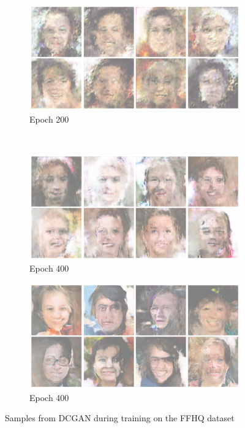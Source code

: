 \begin{figure}
    \begin{subfigure}[b]{0.45\textwidth}
        \includegraphics[width=\textwidth]{fig/dcgan/ffhq/epoch2000}
        \caption{Epoch 200}
    \end{subfigure}
    ~
    \begin{subfigure}[b]{0.45\textwidth}
        \includegraphics[width=\textwidth]{fig/dcgan/ffhq/epoch4000}
        \caption{Epoch 400}
    \end{subfigure}

    \begin{subfigure}[b]{\textwidth}
        \includegraphics[width=\textwidth]{fig/dcgan/ffhq/epoch10000}
        \caption{Epoch 400}
    \end{subfigure}
    \caption{Samples from DCGAN during training on the FFHQ dataset}
    \label{dcgan-ffhq-samples}
\end{figure}

